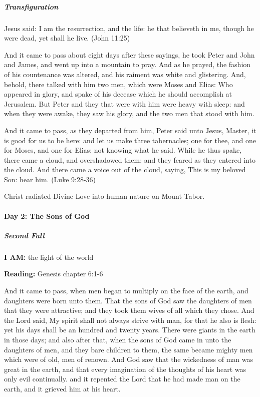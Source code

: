\subparagraph{Transfiguration}

\begin{quotex}
Jesus said: I am the resurrection, and the life: he that believeth in me, though he were dead, yet shall he live. (John 11:25)


And it came to pass about eight days after these sayings, he took Peter and John and James, and went up into a mountain to pray. And as he prayed, the fashion of his countenance was altered, and his raiment was white and glistering. And, behold, there talked with him two men, which were Moses and Elias: Who appeared in glory, and spake of his decease which he should accomplish at Jerusalem. But Peter and they that were with him were heavy with sleep: and when they were awake, they saw his glory, and the two men that stood with him.


And it came to pass, as they departed from him, Peter said unto Jesus, Master, it is good for us to be here: and let us make three tabernacles; one for thee, and one for Moses, and one for Elias: not knowing what he said. While he thus spake, there came a cloud, and overshadowed them: and they feared as they entered into the cloud. And there came a voice out of the cloud, saying, This is my beloved Son: hear him. (Luke 9:28-36) 

\end{quotex}
Christ radiated Divine Love into human nature on Mount Tabor.


\paragraph{Day 2: The Sons of God}

\subparagraph{Second Fall}

\textbf{I AM:} the light of the world

\textbf{Reading:} Genesis chapter 6:1-6


\begin{quotex}
And it came to pass, when men began to multiply on the face of the earth, and daughters were born unto them. That the sons of God saw the daughters of men that they were attractive; and they took them wives of all which they chose. And the Lord said, My spirit shall not always strive with man, for that he also is flesh: yet his days shall be an hundred and twenty years. There were giants in the earth in those days; and also after that, when the sons of God came in unto the daughters of men, and they bare children to them, the same became mighty men which were of old, men of renown. And God saw that the wickedness of man was great in the earth, and that every imagination of the thoughts of his heart was only evil continually. and it repented the Lord that he had made man on the earth, and it grieved him at his heart. 

\end{quotex}


